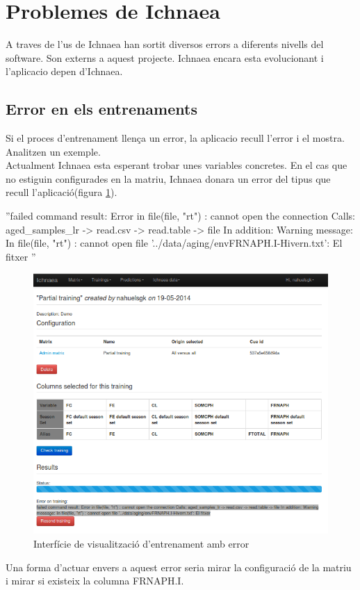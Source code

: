 \section{Problemes de Ichnaea}
\label{sec:ichnaeaErrors}
A traves de l'us de Ichnaea han sortit diversos errors a diferents nivells del software. Son externs a aquest projecte. Ichnaea encara esta evolucionant i l'aplicacio depen d'Ichnaea.

\subsection{Error en els entrenaments}
Si el proces d'entrenament llença un error, la aplicacio recull l'error i el mostra. Analitzen un exemple.\\

Actualment Ichnaea esta esperant trobar unes variables concretes. En el cas que no estiguin configurades en la matriu, Ichnaea donara un error del tipus que recull l'aplicació(figura \ref{fig:viewtrainingerror}).

\begin{center}
''failed command result: Error in file(file, "rt") : cannot open the connection Calls: aged_samples_lr -> read.csv -> read.table -> file In addition: Warning message: In file(file, "rt") : cannot open file '../data/aging/envFRNAPH.I-Hivern.txt': El fitxer ''
\end{center}

\begin{figure}[h!]
  \centering
  \includegraphics[scale=0.5]{img/userguide/error_training.png}
  \caption{Interfície de visualització d'entrenament amb error}
  \label{fig:viewtrainingerror}
\end{figure}
Una forma d'actuar envers a aquest error seria mirar la configuració de la matriu i mirar si existeix la columna FRNAPH.I.
